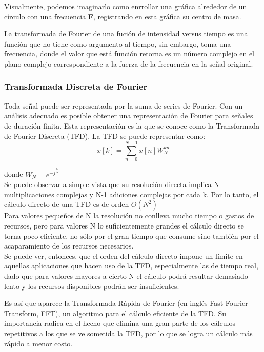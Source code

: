 \documentclass{article}
\begin{document}
Visualmente, podemos imaginarlo como enrrollar una gráfica alrededor de un círculo con una frecuencia \textbf{F}, registrando en esta gráfica su centro de masa.

La transformada de Fourier de una fución de intensidad versus tiempo es una función que no tiene como argumento al tiempo, sin embargo, toma una frecuencia, donde el valor que está función retorna es un número complejo en el plano complejo correspondiente a la fuerza de la frecuencia en la señal original. 

\subsubsection{Transformada Discreta de Fourier}

Toda señal puede ser representada por la suma de series de Fourier. Con un análisis adecuado es posible obtener una representación de Fourier para señales de duración finita. Esta representación es la que se conoce como la Transformada de Fourier Discreta (TFD). La TFD se puede representar como:
$$
x[k]=\sum_{n=0}^{N-1}x[n]W_{N}^{kn}
$$

donde $W_{N}=e^{-j^{\frac{2\pi}{N}}}$\\

Se puede observar a simple vista que su resolución directa implica N multiplicaciones complejas y N-1
adiciones complejas por cada k. Por lo tanto, el cálculo directo de una TFD es de orden $O(N^{2})$\\

Para valores pequeños de N la resolución no conlleva mucho tiempo o gastos de recursos, pero para valores N lo suficientemente grandes el cálculo directo se torna poco eficiente, no sólo por el gran tiempo que
consume sino también por el acaparamiento de los recursos necesarios.\\

Se puede ver, entonces, que el orden del cálculo directo impone un límite en aquellas aplicaciones que hacen uso de la TFD, especialmente las de tiempo real, dado que para valores mayores a cierto N el cálculo podrá
resultar demasiado lento y los recursos disponibles podrán ser insuficientes.

Es así que aparece la Transformada Rápida de Fourier (en inglés Fast Fourier Transform, FFT), un algoritmo para el cálculo eficiente de la TFD. Su importancia radica en el hecho que elimina una gran parte de
los cálculos repetitivos a los que se ve sometida la TFD, por lo que se logra un cálculo más rápido a menor costo.\\
\end{document}
